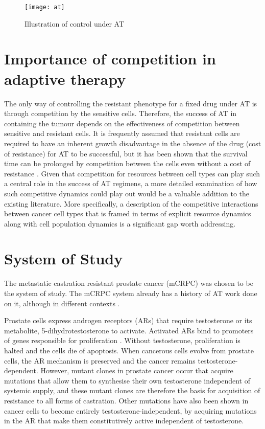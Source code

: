 \begin{figure}[h]
  \centering
  \texttt{[image: at]}
  \caption{Illustration of control under AT}
  \label{at}
\end{figure}

\section{Importance of competition in adaptive therapy}
The only way of controlling the resistant phenotype for a fixed drug under AT is through competition by the sensitive cells. Therefore, the success of AT in containing the tumour depends on the effectiveness of competition between sensitive and resistant cells. It is frequently assumed that resistant cells are required to have an inherent growth disadvantage in the absence of the drug (cost of resistance) for AT to be successful, but it has been shown that the survival time can be prolonged by competition between the cells even without a cost of resistance \cite{Strobl}. Given that competition for resources between cell types can play such a central role in the success of AT regimens, a more detailed examination of how such competitive dynamics could play out would be a valuable addition to the existing literature. More specifically, a description of the competitive interactions between cancer cell types that is framed in terms of explicit resource dynamics along with cell population dynamics is a significant gap worth addressing.

\section{System of Study}
The metastatic castration resistant prostate cancer (mCRPC) was chosen to be the system of study. The mCRPC system already has a history of AT work done on it, although in different contexts \cite{Cunningham,Zhang}.

Prostate cells express androgen receptors (ARs) that require testosterone or its metabolite, 5-dihydrotestosterone to activate. Activated ARs bind to promoters of genes responsible for proliferation \cite{Heinlein}. Without testosterone, proliferation is halted and the cells die of apoptosis. When cancerous cells evolve from prostate cells, the AR mechanism is preserved and the cancer remains testosterone-dependent. However, mutant clones in prostate cancer occur that acquire mutations that allow them to synthesise their own testosterone independent of systemic supply, and these mutant clones are therefore the basis for acquisition of resistance to all forms of castration. Other mutations have also been shown in cancer cells to become entirely testosterone-independent, by acquiring mutations in the AR that make them constitutively active independent of testosterone.

